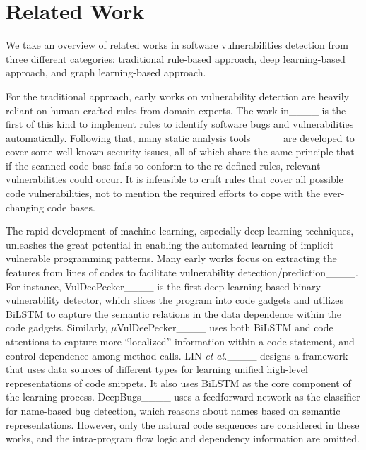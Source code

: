 \section{Related Work}
\label{sec:related}

We take an overview of related works in software vulnerabilities detection from three different categories: 
traditional rule-based approach, deep learning-based approach, and graph learning-based approach. 

For the traditional approach, early works on vulnerability detection are heavily reliant on human-crafted rules from domain experts. 
The work in____ is the first of this kind to implement rules to identify software bugs and vulnerabilities automatically. 
Following that, many static analysis tools____ 
are developed to cover some well-known security issues, all of which share the same principle 
that if the scanned code base fails to conform to the re-defined rules, 
relevant vulnerabilities could occur. 
It is infeasible to craft rules that cover all possible code vulnerabilities, 
not to mention the required efforts to cope with the ever-changing code bases.

The rapid development of machine learning, especially deep learning techniques, 
unleashes the great potential in enabling the automated learning of implicit vulnerable programming patterns. 
Many early works focus on extracting the features from lines of codes to 
facilitate vulnerability detection/prediction____. 
For instance, 
VulDeePecker____ is the first deep learning-based binary vulnerability detector, 
which slices the program into code gadgets and utilizes BiLSTM to capture the semantic relations in the data dependence within the code gadgets. 
%
Similarly, $\mu$VulDeePecker____ uses both BiLSTM and code attentions to capture more ``localized'' information within a code statement, 
and control dependence among method calls. 
%
LIN \textit{et al.}____ designs a framework that uses data sources of different types for learning unified high-level representations of code snippets. 
It also uses BiLSTM as the core component of the learning process. 
%
DeepBugs____ uses a feedforward network as the classifier for name-based bug detection, 
which reasons about names based on semantic representations. 
However, only the natural code sequences are considered in these works, 
and the intra-program flow logic and dependency information are omitted. 


